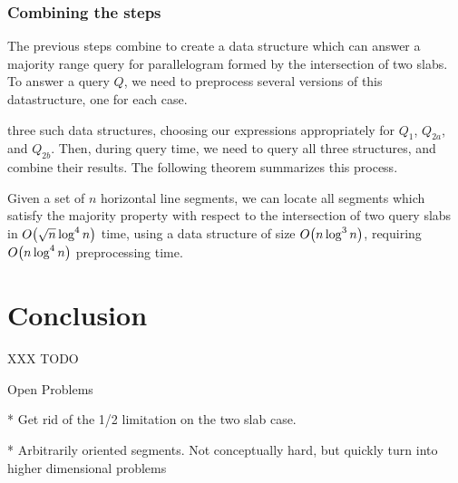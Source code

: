 \subsubsection{Combining the steps}

The previous steps combine to create a data structure which can answer a majority range query for parallelogram formed by the intersection of two slabs. To answer a query $Q$, we need to preprocess several versions of this datastructure, one for each case.

 three such data structures, choosing our expressions appropriately for $Q_1$, $Q_{2a}$, and $Q_{2b}$.  Then, during query time, we need to query all three structures, and combine their results. The following theorem summarizes this process.

\begin{theorem}
\label{thm:slabs:two}
Given a set of $n$ horizontal line segments, we can locate all segments which satisfy the majority property with respect to the intersection of two query slabs in $O\!\left(\sqrt{n}\log^4{n}\right)$ time, using a data structure of size $O\!\left(n\log^3{n}\right)$, requiring $O\!\left(n\log^4{n}\right)$ preprocessing time.
\end{theorem}



\section{Conclusion}
\label{:slabs:concl}

XXX TODO

Open Problems

* Get rid of the 1/2 limitation on the two slab case.

* Arbitrarily oriented segments. Not conceptually hard, but quickly turn into higher dimensional problems

